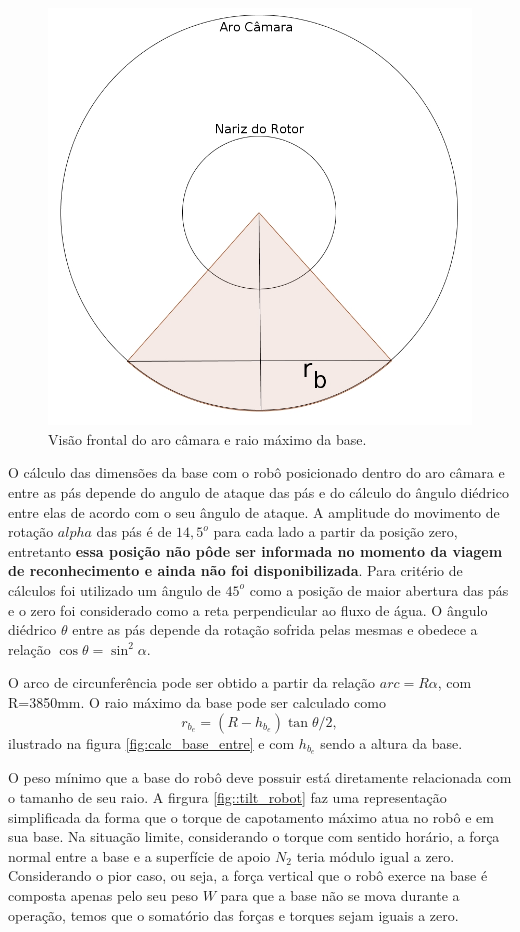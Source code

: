 \begin{figure}[h!]
\centering
	\includegraphics[width=0.9\columnwidth]{figs/base/base_aro_frente.jpg}
	\caption{Visão frontal do aro câmara e raio máximo da base.}
	\label{fig::base_aro_frente}
\end{figure}

O cálculo das dimensões da base com o robô posicionado dentro do aro câmara e
entre as pás depende do angulo de ataque das pás e do cálculo do ângulo diédrico
entre elas de acordo com o seu ângulo de ataque. A amplitude do movimento de
rotação $alpha$ das pás é de $14,5^o$ para cada lado a partir da posição zero, entretanto \textbf{essa posição não pôde ser
informada no momento da viagem de reconhecimento e ainda não foi
disponibilizada}. Para critério de cálculos foi utilizado um ângulo de
$45^o$ como a posição de maior abertura das pás e o zero foi considerado como
a reta perpendicular ao fluxo de água. O ângulo diédrico $\theta$ entre as pás depende da rotação
sofrida pelas mesmas e obedece a relação $\cos{\theta} = \sin^2{\alpha}.$

O arco de circunferência pode ser obtido a partir da relação $arc=R\alpha$, com
R=3850mm. O raio máximo da base pode ser calculado como 
$$r_{b_e} = (R - h_{b_e})\tan{\theta/2},$$  ilustrado na figura
\ref{fig:calc_base_entre} e com $h_{b_e}$ sendo a altura da base.

O peso mínimo que a base do robô deve possuir está diretamente relacionada com o
tamanho de seu raio. A firgura \ref{fig::tilt_robot} faz uma representação
simplificada da forma que o torque de capotamento máximo atua no robô e em sua
base. Na situação limite, considerando o torque com sentido horário, a força
normal entre a base e a superfície de apoio $N_2$ teria módulo igual a zero.
Considerando o pior caso, ou seja, a força vertical que o robô exerce na base é
composta apenas pelo seu peso $W$ para que a base não se mova durante a
operação, temos que o somatório das forças e torques sejam iguais a zero.

